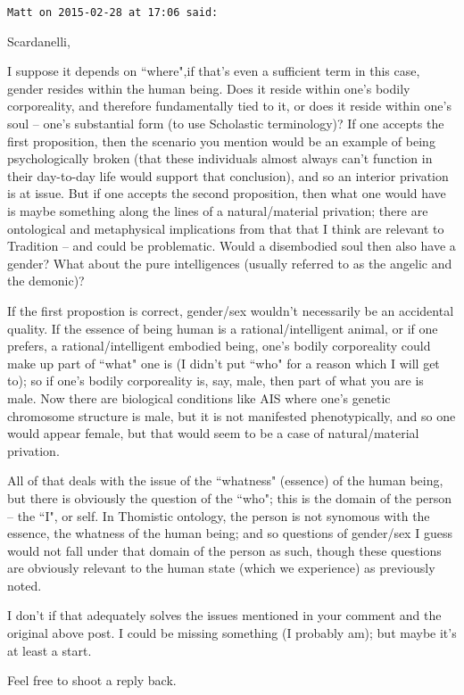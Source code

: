 \begin{footnotesize}
\begin{sffamily}
\texttt{Matt on 2015-02-28 at 17:06 said: }

Scardanelli,

I suppose it depends on ``where",if that's even a sufficient term in this case, gender resides within the human being. Does it reside within one's bodily corporeality, and therefore fundamentally tied to it, or does it reside within one's soul – one's substantial form (to use Scholastic terminology)? If one accepts the first proposition, then the scenario you mention would be an example of being psychologically broken (that these individuals almost always can't function in their day-to-day life would support that conclusion), and so an interior privation is at issue. But if one accepts the second proposition, then what one would have is maybe something along the lines of a natural/material privation; there are ontological and metaphysical implications from that that I think are relevant to Tradition – and could be problematic. Would a disembodied soul then also have a gender? What about the pure intelligences (usually referred to as the angelic and the demonic)?

If the first propostion is correct, gender/sex wouldn't necessarily be an accidental quality. If the essence of being human is a rational/intelligent animal, or if one prefers, a rational/intelligent embodied being, one's bodily corporeality could make up part of ``what" one is (I didn't put ``who" for a reason which I will get to); so if one's bodily corporeality is, say, male, then part of what you are is male. Now there are biological conditions like AIS where one's genetic chromosome structure is male, but it is not manifested phenotypically, and so one would appear female, but that would seem to be a case of natural/material privation.

All of that deals with the issue of the ``whatness" (essence) of the human being, but there is obviously the question of the ``who"; this is the domain of the person – the ``I", or self. In Thomistic ontology, the person is not synomous with the essence, the whatness of the human being; and so questions of gender/sex I guess would not fall under that domain of the person as such, though these questions are obviously relevant to the human state (which we experience) as previously noted.

I don't if that adequately solves the issues mentioned in your comment and the original above post. I could be missing something (I probably am); but maybe it's at least a start.

Feel free to shoot a reply back.



\end{sffamily}
\end{footnotesize}

